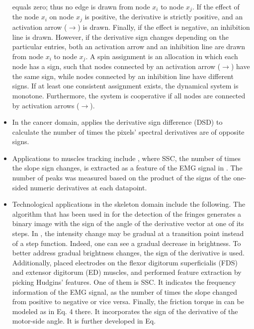 \documentclass[11pt]{book}
\begin{document}
\begin{itemize}
equals zero; thus no edge is drawn from node $x_{i}$ to node $x_{j}$.
If the effect of the node $x_{i}$ on node $x_{j}$ is positive, the
derivative is strictly positive, and an activation arrow ($\rightarrow$)
is drawn. Finally, if the effect is negative, an inhibition line is
drawn. However, if the derivative sign changes depending on the particular
entries, both an activation arrow and an inhibition line are drawn
from node $x_{i}$ to node $x_{j}$. A spin assignment is an allocation
in which each node has a sign, such that nodes connected by an activation
arrow ($\rightarrow$) have the same sign, while nodes connected by
an inhibition line have different signs. If at least one consistent
assignment exists, the dynamical system is monotone. Furthermore,
the system is cooperative if all nodes are connected by activation
arrows ($\rightarrow$).
\item In the cancer domain, \cite{pike2015minimum}
applies the derivative sign difference (DSD) to calculate the number
of times the pixels\textquoteright{} spectral derivatives are of opposite
signs.
\item Applications to muscles tracking include \cite{luppescuclassification,waris2018effect,wahid2018subject,cengiz2020detection,fajardo2021emg},
where SSC, the number of times the slope sign changes, is extracted
as a feature of the EMG signal in . The number of peaks was measured
based on the product of the signs of the one-sided numeric derivatives
at each datapoint.
\item Technological applications in the skeleton domain include the following.
The algorithm that has been used in \cite{rodriguez2004plane}
for the detection of the fringes generates a binary image with the
sign of the angle of the derivative vector at one of its steps. In
\cite{jebri2015detection},
the intensity change may be gradual at a transition point instead
of a step function. Indeed, one can see a gradual decrease in brightness.
To better address gradual brightness changes, the sign of the derivative
is used. Additionally, \cite{shi2018bionic}
placed electrodes on the flexor digitorum superficialis (FDS) and
extensor digitorum (ED) muscles, and performed feature extraction
by picking Hudgins' features. One of them is SSC. It indicates the
frequency information of the EMG signal, as the number of times the
slope changed from positive to negative or vice versa. Finally, the
friction torque in \cite{zhang2018lower}
can be modeled as in Eq. 4 there. It incorporates the sign of the
derivative of the motor-side angle. It is further developed in Eq.

\end{itemize}
\end{document}
